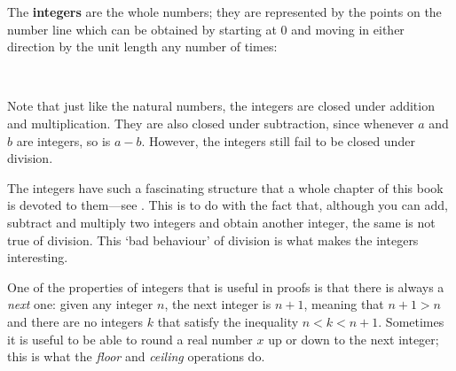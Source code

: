 \begin{definition}
\label{defIntegerInformal}
The \textbf{integers} are the whole numbers; they are represented by the points on the number line which can be obtained by starting at $0$ and moving in either direction by the unit length any number of times:
\begin{center}
\end{center}
~
\end{definition}

Note that just like the natural numbers, the integers are closed under addition and multiplication. They are also closed under subtraction, since whenever $a$ and $b$ are integers, so is $a-b$. However, the integers still fail to be closed under division.

The integers have such a fascinating structure that a whole chapter of this book is devoted to them---see . This is to do with the fact that, although you can add, subtract and multiply two integers and obtain another integer, the same is not true of division. This `bad behaviour' of division is what makes the integers interesting.

One of the properties of integers that is useful in proofs is that there is always a \textit{next} one: given any integer $n$, the next integer is $n+1$, meaning that $n+1>n$ and there are no integers $k$ that satisfy the inequality $n<k<n+1$. Sometimes it is useful to be able to round a real number $x$ up or down to the next integer; this is what the \textit{floor} and \textit{ceiling} operations do.

